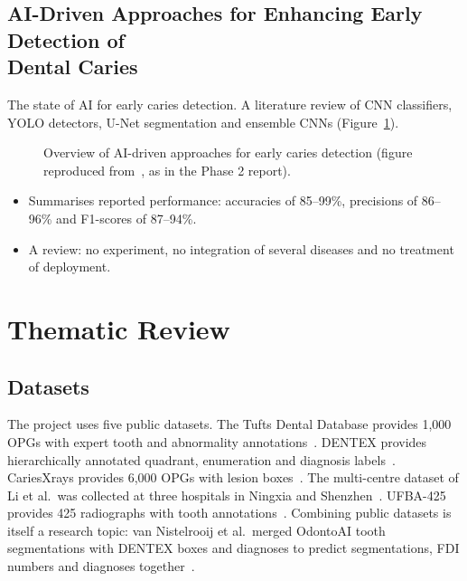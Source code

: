 \subsection[AI-Driven Approaches for Enhancing Early Detection of Dental Caries]{AI-Driven Approaches for Enhancing Early Detection of\\ Dental Caries~\cite{sastika2025ai}}
 The state of AI for early caries detection.
 A literature review of CNN classifiers, YOLO detectors, U-Net segmentation and
ensemble CNNs (Figure~\ref{fig:lit-sastika}).

\begin{figure}[!htbp]
\centering
{}
\caption[Overview of AI-driven approaches for early caries detection]{Overview of AI-driven approaches
for early caries detection (figure reproduced from~\cite{sastika2025ai}, as in the Phase 2 report).}
\label{fig:lit-sastika}
\end{figure}

\begin{itemize}
\item Summarises reported performance: accuracies of 85--99\%, precisions of 86--96\% and F1-scores
  of 87--94\%.
\end{itemize}
\begin{itemize}
\item A review: no experiment, no integration of several diseases and no treatment of deployment.
\end{itemize}

\section{Thematic Review}

\subsection{Datasets}

The project uses five public datasets. The Tufts Dental Database provides 1,000 OPGs with expert
tooth and abnormality annotations~\cite{panetta2022tufts}. DENTEX provides hierarchically annotated
quadrant, enumeration and diagnosis labels~\cite{hamamci2023dentex}. CariesXrays provides 6,000 OPGs
with lesion boxes~\cite{chen2024cariesxrays}. The multi-centre dataset of Li et al.\ was collected at
three hospitals in Ningxia and Shenzhen~\cite{li2024multicenter}. UFBA-425 provides 425 radiographs
with tooth annotations~\cite{budagam2024oralbbnet}. Combining public datasets is itself a research
topic: van Nistelrooij et al.\ merged OdontoAI tooth segmentations with DENTEX boxes and diagnoses to
predict segmentations, FDI numbers and diagnoses together~\cite{vannistelrooij2024combining}. %

